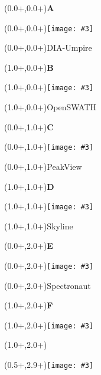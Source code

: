 \documentclass{article}
\newlength{\panelWidth} \newlength{\panelHeight}
\newlength{\labXshift} \newlength{\labYshift}
\newlength{\picXshift} \newlength{\picYshift}
\newlength{\txtXshift} \newlength{\txtYshift}
\newlength{\picWidth}
\newcommand{\txt}[3]{\begin{textblock*}{\panelWidth}(#1+\txtXshift,#2+\txtYshift){#3}\end{textblock*}}
\newcommand{\lab}[3]{\begin{textblock*}{\panelWidth}(#1+\labXshift,#2+\labYshift)\textbf{\LARGE #3}\end{textblock*}}
\newcommand{\pic}[3]{\begin{textblock*}{\panelWidth}(#1+\picXshift,#2+\picYshift)\texttt{[image: \#3]}\end{textblock*}}
\newcommand{\fig}[5]{ \lab{#1}{#2}{#3} \pic{#1}{#2}{#4} \txt{#1}{#2}{#5} }
\begin{document}

\fig{0.0\panelWidth}{0.0\panelHeight}{A}{../output/DIAumpire_peptides_r1.pdf}{DIA-Umpire}
\fig{1.0\panelWidth}{0.0\panelHeight}{B}{../output/openSWATH_peptides_r1.pdf}{OpenSWATH}
\fig{0.0\panelWidth}{1.0\panelHeight}{C}{../output/PeakView_peptides_r1.pdf}{PeakView}
\fig{1.0\panelWidth}{1.0\panelHeight}{D}{../output/Skyline_peptides_r1.pdf}{Skyline}
\fig{0.0\panelWidth}{2.0\panelHeight}{E}{../output/Spectronaut_peptides_r1.pdf}{Spectronaut}
\fig{1.0\panelWidth}{2.0\panelHeight}{F}{../output/missing_values_peptides_r1.pdf}{}
\pic{0.5\panelWidth}{2.9\panelHeight}{../output/species_legend_h.pdf}
\end{document}
